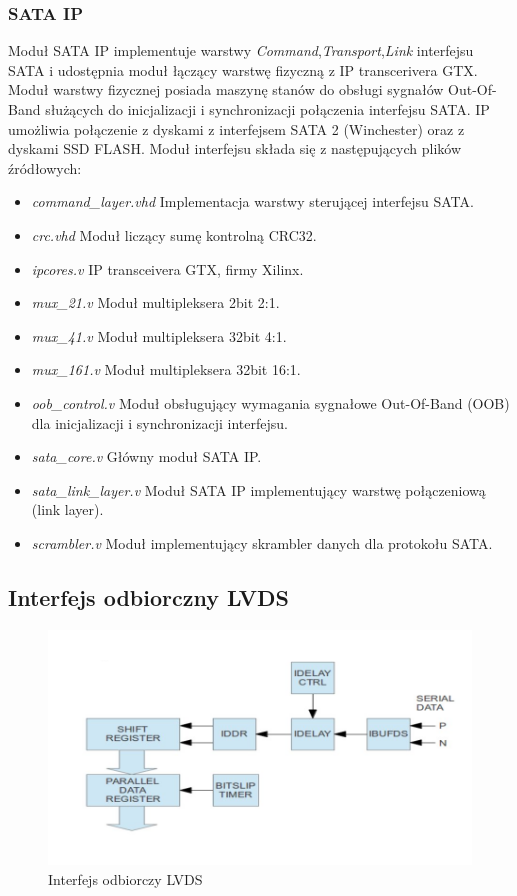 \documentclass[a4paper,11pt,oneside]{report}  %
\begin{document}
\subsubsection{SATA IP}
Moduł SATA IP implementuje warstwy \textit{Command},\textit{Transport},\textit{Link} interfejsu SATA \cite{SATA} i udostępnia moduł łączący warstwę fizyczną z IP transcerivera GTX. Moduł warstwy fizycznej posiada maszynę stanów do obsługi sygnałów Out-Of-Band służących do inicjalizacji i synchronizacji połączenia interfejsu SATA. IP umożliwia połączenie z dyskami z interfejsem SATA 2 (Winchester) oraz z dyskami SSD FLASH. Moduł interfejsu składa się z następujących plików źródłowych:

\begin{itemize}
\item \textit{command\_layer.vhd} Implementacja warstwy sterującej interfejsu SATA.
\item \textit{crc.vhd} Moduł liczący sumę kontrolną CRC32.
\item \textit{ipcores.v} IP transceivera GTX, firmy Xilinx.
\item \textit{mux\_21.v} Moduł multipleksera 2bit 2:1.
\item \textit{mux\_41.v} Moduł multipleksera 32bit 4:1.
\item \textit{mux\_161.v} Moduł multipleksera 32bit 16:1.
\item \textit{oob\_control.v} Moduł obsługujący wymagania sygnałowe Out-Of-Band (OOB) dla inicjalizacji i synchronizacji interfejsu.
\item \textit{sata\_core.v} Główny moduł SATA IP.
\item \textit{sata\_link\_layer.v} Moduł SATA IP implementujący warstwę połączeniową (link layer).
\item \textit{scrambler.v} Moduł implementujący skrambler danych dla protokołu SATA.
\end{itemize}



\subsection{Interfejs odbiorczny LVDS}

\begin{figure}[H]
	\centering
	\includegraphics[width=12cm]{data5.png}
	\caption{Interfejs odbiorczy LVDS}
	\label{fig:Zynq5}
\end{figure}
\end{document}
